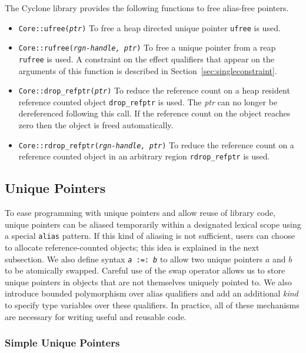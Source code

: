 The Cyclone library provides the following functions to free
alias-free pointers.

\begin{itemize}
\item \texttt{Core::ufree({\it ptr})}
  To free a heap directed unique pointer {\tt ufree} is used. 

\item \texttt{Core::rufree({\it rgn-handle, ptr})} To free a
unique pointer from a reap {\tt rufree} is used. A constraint on the
effect qualifiers that appear on the arguments of this function is
described in Section~\ref{sec:singleconstraint}.

\item \texttt{Core::drop\_refptr({\it ptr})}
To reduce the reference count on a heap resident reference counted
object {\tt drop\_refptr} is used. The {\it ptr} can no longer be
dereferenced following this call. If the reference count on the object
reaches zero then the object is freed automatically.

\item \texttt{Core::rdrop\_refptr({\it rgn-handle, ptr})} To reduce
the reference count on a reference counted object in an arbitrary
region {\tt rdrop\_refptr} is used.

\end{itemize}

\subsection{Unique Pointers}

To ease programming with unique pointers and allow reuse of library
code, unique pointers can be aliased temporarily within a designated
lexical scope using a special \texttt{alias} pattern.  If this kind of
aliasing is not sufficient, users can choose to allocate
reference-counted objects; this idea is explained in the next
subsection.  We also define syntax \texttt{{\it a} :=: {\it b}} to
allow two unique pointers $a$ and $b$ to be atomically swapped.
Careful use of the swap operator allows us to store unique pointers in
objects that are not themselves uniquely pointed to.  We also
introduce bounded polymorphism over alias qualifiers and add an
additional \emph{kind} to specify type variables over these
qualifiers. In practice, all of these mechanisms are necessary for
writing useful and reusable code.

\subsubsection{Simple Unique Pointers}

